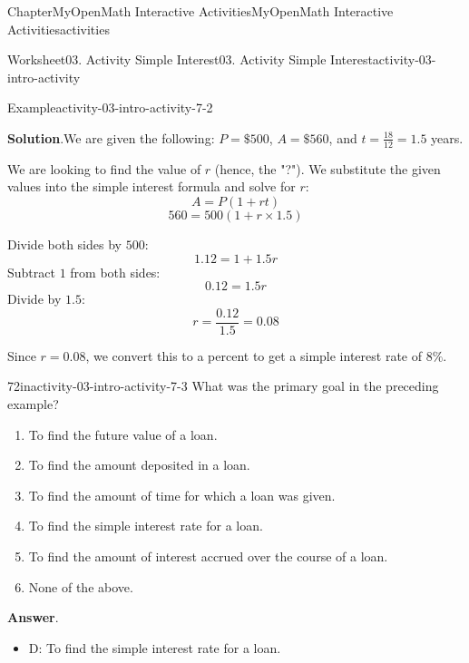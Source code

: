 \documentclass[oneside,10pt,]{book}
\newcommand{\blocktitlefont}{\relax}
\newcommand{\ptxlistdisc}{\raisebox{0.3ex}{\textbullet}}
\begin{document}
\begin{chapterptx}{Chapter}{MyOpenMath Interactive Activities}{}{MyOpenMath Interactive Activities}{}{}{activities}
\begin{worksheet-section}{Worksheet}{03. Activity Simple Interest}{}{03. Activity Simple Interest}{}{}{activity-03-intro-activity}
\begin{example}{Example}{}{activity-03-intro-activity-7-2}
\par\smallskip%
\noindent\textbf{\blocktitlefont Solution}.\hypertarget{activity-03-intro-activity-7-2-2}{}\quad{}We are given the following: \(P = \$500\), \(A = \$560\), and \(t = \frac{18}{12} = 1.5\) years.%
\par
We are looking to find the value of \(r\) (hence, the "?"). We substitute the given values into the simple interest formula and solve for \(r\):%
\begin{equation*}
A = P(1 + rt)
\end{equation*}
%
\begin{equation*}
560 = 500(1 + r \times 1.5)
\end{equation*}
%
\par
Divide both sides by \(500\):%
\begin{equation*}
1.12 = 1 + 1.5r
\end{equation*}
Subtract \(1\) from both sides:%
\begin{equation*}
0.12 = 1.5r
\end{equation*}
Divide by \(1.5\):%
\begin{equation*}
r = \frac{0.12}{1.5} = 0.08
\end{equation*}
%
\par
Since \(r = 0.08\), we convert this to a percent to get a simple interest rate of \(8\%\).%
\end{example}
\begin{divisionexercise}{7}{}{2in}{activity-03-intro-activity-7-3}%
What was the primary goal in the preceding example?%
\par
%
\begin{enumerate}[label={(\alph*)}]
\item{}To find the future value of a loan.%
\item{}To find the amount deposited in a loan.%
\item{}To find the amount of time for which a loan was given.%
\item{}To find the simple interest rate for a loan.%
\item{}To find the amount of interest accrued over the course of a loan.%
\item{}None of the above.%
\end{enumerate}
%
\par\smallskip%
\noindent\textbf{\blocktitlefont Answer}.\hypertarget{activity-03-intro-activity-7-3-2}{}\quad{}%
\begin{itemize}[label=\ptxlistdisc]
\item{}D: To find the simple interest rate for a loan.%

\end{itemize}
\end{divisionexercise}
\end{worksheet-section}
\end{chapterptx}
\end{document}
